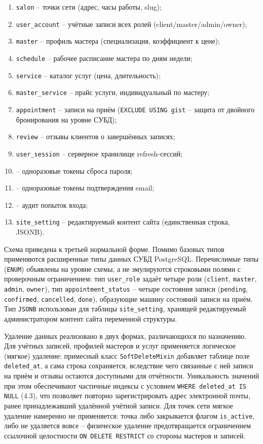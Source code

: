 \begin{enumerate}
  \item \texttt{salon} -- точки сети (адрес, часы работы, slug);
  \item \texttt{user\_account} -- учётные записи всех ролей (client/master/admin/owner);
  \item \texttt{master} -- профиль мастера (специализация, коэффициент к цене);
  \item \texttt{schedule} -- рабочее расписание мастера по дням недели;
  \item \texttt{service} -- каталог услуг (цена, длительность);
  \item \texttt{master\_service} -- прайс услуги, индивидуальный по мастеру;
  \item \texttt{appointment} -- записи на приём (\texttt{EXCLUDE USING gist}
        -- защита от двойного бронирования на уровне СУБД);
  \item \texttt{review} -- отзывы клиентов о завершённых записях;
  \item \texttt{user\_session} -- серверное хранилище refresh-сессий;
  \item {} -- одноразовые токены сброса пароля;
  \item {} -- одноразовые токены
        подтверждения email;
  \item {} -- аудит попыток входа;
  \item \texttt{site\_setting} -- редактируемый контент сайта (единственная
        строка, JSONB).
\end{enumerate}

Схема приведена к третьей нормальной форме. Помимо базовых типов
применяются расширенные типы данных СУБД PostgreSQL. Перечислимые типы
(\texttt{ENUM}) объявлены на уровне схемы, а не эмулируются строковыми
полями с проверочным ограничением: тип \texttt{user\_role} задаёт четыре
роли (\texttt{client}, \texttt{master}, \texttt{admin},
\texttt{owner}), тип \texttt{appointment\_status} -- четыре состояния
записи (\texttt{pending}, \texttt{confirmed}, \texttt{cancelled},
\texttt{done}), образующие машину состояний записи на приём. Тип
\texttt{JSONB} использован для таблицы \texttt{site\_setting}, хранящей
редактируемый администратором контент сайта переменной структуры.

Удаление данных реализовано в двух формах, различающихся по назначению.
Для учётных записей, профилей мастеров и услуг применяется логическое
(мягкое) удаление: примесный класс \texttt{SoftDeleteMixin} добавляет
таблице поле \texttt{deleted\_at}, а сама строка сохраняется, вследствие
чего связанные с ней записи на приём и отзывы остаются доступными для
отчётности. Уникальность значений при этом обеспечивают частичные
индексы с условием \texttt{WHERE deleted\_at IS NULL} (4.3), что
позволяет повторно зарегистрировать адрес электронной почты, ранее
принадлежавший удалённой учётной записи. Для точек сети мягкое удаление
намеренно не применяется: точка либо закрывается флагом
\texttt{is\_active}, либо не удаляется вовсе -- физическое удаление
предотвращается ограничением ссылочной целостности \texttt{ON DELETE
RESTRICT} со стороны мастеров и записей.

